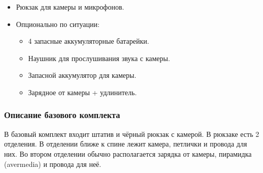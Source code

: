 \begin{itemize}[noitemsep]
  \item Рюкзак для камеры и микрофонов.
        \vspace{5pt}

  \item Опционально по ситуации:
        \begin{itemize}
          \item 4 запасные аккумуляторные батарейки.
          \item Наушник для прослушивания звука с камеры.
          \item Запасной аккумулятор для камеры.
          \item Зарядное от камеры + удлинитель.
        \end{itemize}
\end{itemize}
\vspace{10pt}

\subsubsection{Описание базового комплекта}

В базовый комплект входит штатив и чёрный рюкзак с камерой. В рюкзаке есть 2 отделения. В отделении ближе к спине лежит камера, петлички и провода для них. Во втором отделении обычно располагается зарядка от камеры, пирамидка (avermedia) и провода для неё.


